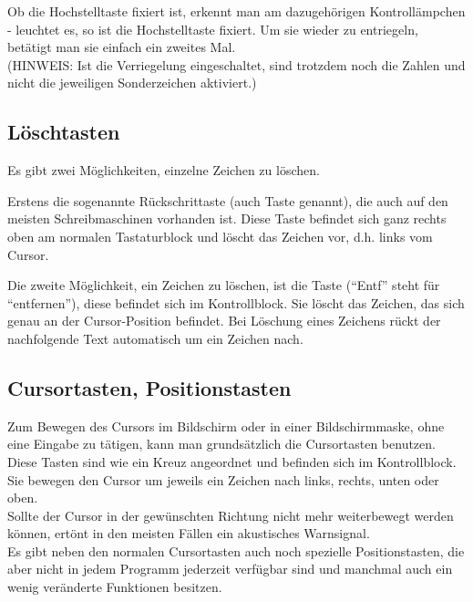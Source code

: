 Ob die Hochstelltaste fixiert ist, erkennt man am dazugeh\"{o}rigen
Kontroll\"{a}mpchen - leuchtet es, so ist die Hochstelltaste fixiert.
Um sie wieder zu entriegeln, bet\"{a}tigt man sie einfach ein zweites Mal.\\

(HINWEIS: Ist die Verriegelung eingeschaltet, sind trotzdem noch die Zahlen und
nicht die jeweiligen Sonderzeichen aktiviert.)


\subsection{L\"{o}schtasten}

Es gibt zwei M\"{o}glichkeiten, einzelne Zeichen zu l\"{o}schen.

Erstens die sogenannte R\"{u}ckschrittaste (auch  Taste
genannt), die auch auf den meisten Schreibmaschinen vorhanden ist.
Diese Taste befindet sich ganz rechts oben am normalen Tastaturblock
und l\"{o}scht das Zeichen vor, d.h. links vom Cursor.

Die zweite M\"{o}glichkeit, ein Zeichen zu l\"{o}schen, ist die Taste
 (``Entf'' steht f\"{u}r ``entfernen''), diese befindet sich
im Kontrollblock. Sie l\"{o}scht das Zeichen, das sich genau an der
Cursor-Position befindet. Bei L\"{o}schung eines Zeichens r\"{u}ckt
der nachfolgende Text automatisch um ein Zeichen nach.

\subsection{Cursortasten, Positionstasten} 

Zum Bewegen des Cursors im Bildschirm oder in einer Bildschirmmaske,
ohne eine Eingabe zu t\"{a}tigen, kann man grunds\"{a}tzlich die
Cursortasten benutzen. Diese Tasten sind wie ein Kreuz angeordnet
und befinden sich im Kontrollblock. Sie bewegen den Cursor um jeweils
ein Zeichen nach links, rechts, unten oder oben.\\
Sollte der Cursor in der gew\"{u}nschten Richtung nicht mehr
weiterbewegt werden k\"{o}nnen, ert\"{o}nt in den meisten F\"{a}llen
ein akustisches Warnsignal.\\
Es gibt neben den normalen Cursortasten auch noch spezielle
Positionstasten, die aber nicht in jedem Programm jederzeit
verf\"{u}gbar sind und manchmal auch ein wenig ver\"{a}nderte
Funktionen besitzen.

